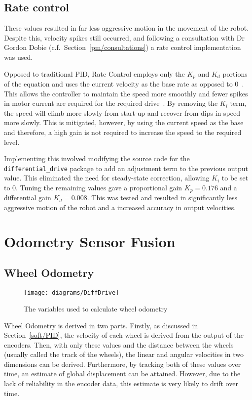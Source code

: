 \subsection{Rate control}\label{soft/PID/rate}

These values resulted in far less aggressive motion in the movement of the
robot. Despite this, velocity spikes still occurred, and following a
consultation with Dr Gordon Dobie (c.f.\ Section~\ref{pm/consultations}) a
rate control implementation was used.

Opposed to traditional PID, Rate Control employs only the $K_p$ and $K_d$ portions of
the equation and uses the current velocity as the base rate as opposed to 0~\cite{koditschek1987quadratic}. This allows the controller to maintain the speed
more smoothly and fewer spikes in motor current are required for the required
drive~\cite{kawamura1988local}. By removing the $K_i$ term, the speed will climb
more slowly from start-up and recover from dips in speed more slowly. This is
mitigated, however, by using the current speed as the base and therefore, a high
gain is not required to increase the speed to the required level.

Implementing this involved modifying the source
code for the \verb|differential_drive| package to add an adjustment term to the
previous output value. This eliminated the need for steady-state correction,
allowing $K_i$ to be set to $0$. Tuning the remaining values gave a proportional
gain $K_p = 0.176$ and a differential gain $K_d = 0.008$. This was tested and
resulted in significantly less aggressive motion of the robot and a increased
accuracy in output velocities.



\section{Odometry Sensor Fusion}\label{soft/odometry}

\subsection{Wheel Odometry}\label{soft/odometry/wheel}

\begin{figure}[!ht]
	\centering
	\texttt{[image: diagrams/DiffDrive]}
	\caption{The variables used to calculate wheel odometry}
	\label{fig:diff_drive_diagram}
\end{figure}

Wheel Odometry is derived in two parts. Firstly, as discussed in Section~\ref{soft/PID}, the velocity of each wheel is derived from the output of the
encoders. Then, with only these values and the distance between the wheels
(usually called the track of the wheels), the linear and angular velocities in two
dimensions can be derived. Furthermore, by tracking both of these values over
time, an estimate of global displacement can be attained. However, due to the lack
of reliability in the encoder data, this estimate is very likely to drift over
time.

